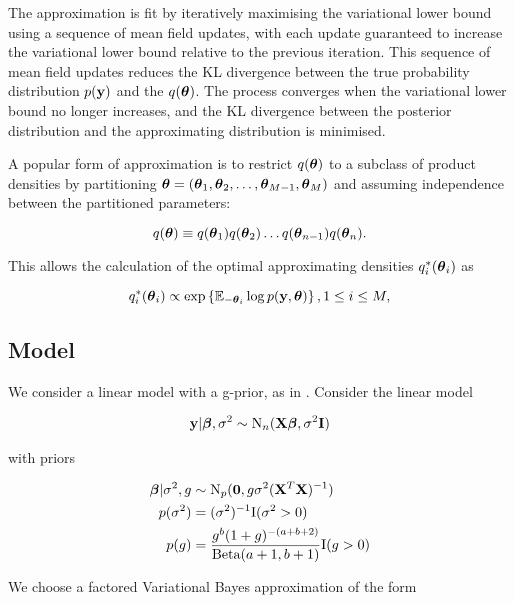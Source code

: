 \documentclass{amsart}[12pt]
\begin{document}
The approximation is fit by iteratively maximising the variational lower bound using a sequence of mean field
updates, with each update guaranteed to increase the variational lower bound relative to the previous
iteration. This sequence of mean field updates reduces the KL divergence between the true probability
distribution $p({\bf y})$ and the $q({\boldsymbol \theta})$. The process converges when the variational lower bound no longer
increases, and the KL divergence between the posterior distribution and the approximating distribution is
minimised.

A popular form of approximation is to restrict $q({\boldsymbol \theta})$ to a subclass of product densities by partitioning
${\boldsymbol \theta} = ({\boldsymbol \theta}_1, {\boldsymbol \theta}_2, \ldots, {\boldsymbol \theta}_{M-1}, {\boldsymbol \theta}_M)$ and assuming independence between the
partitioned parameters:

\begin{equation*}
q({\boldsymbol \theta}) \equiv q({\boldsymbol \theta}_1) q({\boldsymbol \theta}_2) \ldots q({\boldsymbol \theta}_{n-1}) q({\boldsymbol \theta}_n).
\end{equation*}

This allows the calculation of the optimal approximating densities $q_i^*({\boldsymbol \theta}_i)$ as

\begin{equation*}
q_i^*({\boldsymbol \theta}_i) \propto \exp \left \{ \mathbb{E}_{-{\boldsymbol \theta}_i} \log p({\bf y}, {\boldsymbol \theta}) \right \}, 1 \leq i \leq M,
\end{equation*}

\subsection{Model}

We consider a linear model with a g-prior, as in \cite{Liang2008}. Consider the linear model

\begin{align*}
{\bf y} | {\boldsymbol \beta}, \sigma^2 \sim \text{N}_n({\bf X} {\boldsymbol \beta}, \sigma^2 {\bf I})
\end{align*}

with priors

\begin{align*}
{\boldsymbol\beta} | \sigma^2, g &\sim \text{N}_p({\bf 0}, g \sigma^2 ({\bf X}^T {\bf X})^{-1}) \\
p(\sigma^2) &= (\sigma^2)^{-1} \text{I}(\sigma^2 > 0) \\
p(g) &= \frac{g^b (1 + g)^{-(a + b + 2)}}{\text{Beta}(a + 1, b + 1)} \text{I}(g > 0)
\end{align*}

We choose a factored Variational Bayes approximation of the form
\end{document}

